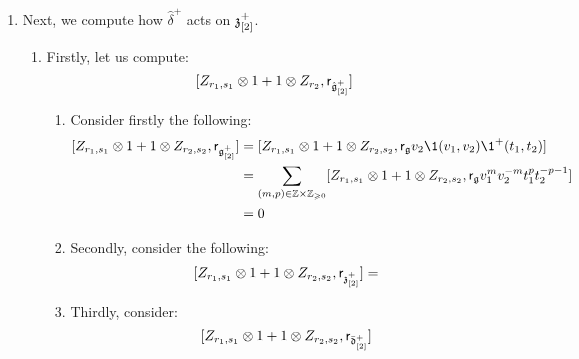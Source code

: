 \begin{remark}
\begin{enumerate}
                    \item Next, we compute how $\hat{\delta}^+$ acts on $\mathfrak{z}_{[2]}^+$. 
                    \begin{enumerate}
                        \item Firstly, let us compute:
                            $$[Z_{r_1, s_1} \tensor 1 + 1 \tensor Z_{r_2}, \sfr_{\hat{\g}_{[2]}^+}]$$
                        \begin{enumerate}
                            \item Consider firstly the following:
                                $$
                                    \begin{aligned}
                                        [Z_{r_1, s_1} \tensor 1 + 1 \tensor Z_{r_2, s_2}, \sfr_{\g_{[2]}^+}] & = [Z_{r_1, s_1} \tensor 1 + 1 \tensor Z_{r_2, s_2}, \sfr_{\g} v_2 \1(v_1, v_2) \1^+(t_1, t_2)]
                                        \\
                                        & = \sum_{(m, p) \in \Z \x \Z_{\geq 0}} [Z_{r_1, s_1} \tensor 1 + 1 \tensor Z_{r_2, s_2}, \sfr_{\g} v_1^m v_2^{-m} t_1^p t_2^{-p - 1}]
                                        \\
                                        & = 0
                                    \end{aligned}
                                $$
                            \item Secondly, consider the following:
                                $$[Z_{r_1, s_1} \tensor 1 + 1 \tensor Z_{r_2, s_2}, \sfr_{\z_{[2]}^+}] = $$
                            \item Thirdly, consider:
                                $$[Z_{r_1, s_1} \tensor 1 + 1 \tensor Z_{r_2, s_2}, \sfr_{\bar{\d}_{[2]}^+}]$$
                        \end{enumerate}
                        

\end{enumerate}
\end{enumerate}
\end{remark}
